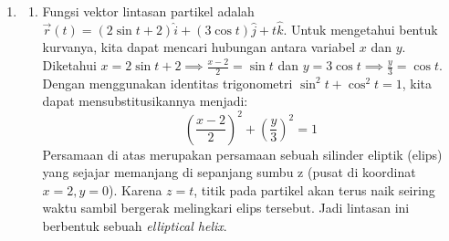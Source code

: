 \documentclass[11pt,letterpaper]{article}
\begin{document}
\begin{enumerate}
  \item \begin{enumerate}[label=\alph*.]
          \item Fungsi vektor lintasan partikel adalah $\vec{r}(t) = (2\sin t + 2)\hat{i} + (3\cos t)\hat{j} + t\hat{k}$.
                Untuk mengetahui bentuk kurvanya, kita dapat mencari hubungan antara variabel $x$ dan $y$.
                Diketahui $x = 2\sin t + 2 \implies \frac{x-2}{2} = \sin t$ dan $y = 3\cos t \implies \frac{y}{3} = \cos t$.
                Dengan menggunakan identitas trigonometri $\sin^2 t + \cos^2 t = 1$, kita dapat mensubstitusikannya menjadi:
                \[ \left(\frac{x-2}{2}\right)^2 + \left(\frac{y}{3}\right)^2 = 1 \]
                Persamaan di atas merupakan persamaan sebuah silinder eliptik (elips) yang sejajar memanjang di sepanjang sumbu z (pusat di koordinat $x=2, y=0$). Karena $z = t$, titik pada partikel akan terus naik seiring waktu sambil bergerak melingkari elips tersebut. Jadi lintasan ini berbentuk sebuah \textit{elliptical helix}.
                \begin{center}
\end{center}
\end{enumerate}
\end{enumerate}
\end{document}
